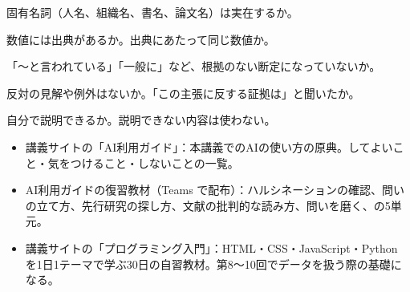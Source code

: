 \begin{checks}
  \item 固有名詞（人名、組織名、書名、論文名）は実在するか。
  \item 数値には出典があるか。出典にあたって同じ数値か。
  \item 「〜と言われている」「一般に」など、根拠のない断定になっていないか。
  \item 反対の見解や例外はないか。「この主張に反する証拠は」と聞いたか。
  \item 自分で説明できるか。説明できない内容は使わない。
\end{checks}

\begin{itemize}
  \item 講義サイトの「AI利用ガイド」：本講義でのAIの使い方の原典。してよいこと・気をつけること・しないことの一覧。
  \item AI利用ガイドの復習教材（Teams で配布）：ハルシネーションの確認、問いの立て方、先行研究の探し方、文献の批判的な読み方、問いを磨く、の5単元。
  \item 講義サイトの「プログラミング入門」：HTML・CSS・JavaScript・Python を1日1テーマで学ぶ30日の自習教材。第8〜10回でデータを扱う際の基礎になる。
\end{itemize}
